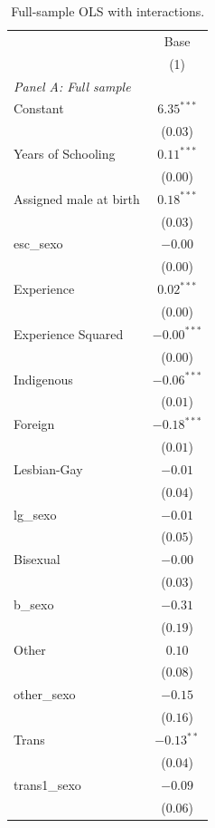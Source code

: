\begin{table}[H]
\begin{center}
\begin{threeparttable}
\captionsetup{margin=0.5cm}
\caption{Full-sample OLS with interactions.}
\label{AT1_full_1col}
\footnotesize
\centering
\begin{tabular}{lc}
\toprule
 & \multicolumn{1}{c}{Base} \\ 
 & (1) \\ \midrule
\textit{Panel A: Full sample} &  \\ 
Constant & $6.35^{***}$ \\ 
 & ($0.03$) \\ 
Years of Schooling & $0.11^{***}$ \\ 
 & ($0.00$) \\ 
Assigned male at birth & $0.18^{***}$ \\ 
 & ($0.03$) \\ 
esc_sexo & $-0.00$ \\ 
 & ($0.00$) \\ 
Experience & $0.02^{***}$ \\ 
 & ($0.00$) \\ 
Experience Squared & $-0.00^{***}$ \\ 
 & ($0.00$) \\ 
Indigenous & $-0.06^{***}$ \\ 
 & ($0.01$) \\ 
Foreign & $-0.18^{***}$ \\ 
 & ($0.01$) \\ 
Lesbian-Gay & $-0.01$ \\ 
 & ($0.04$) \\ 
lg_sexo & $-0.01$ \\ 
 & ($0.05$) \\ 
Bisexual & $-0.00$ \\ 
 & ($0.03$) \\ 
b_sexo & $-0.31$ \\ 
 & ($0.19$) \\ 
Other & $0.10$ \\ 
 & ($0.08$) \\ 
other_sexo & $-0.15$ \\ 
 & ($0.16$) \\ 
Trans & $-0.13^{**}$ \\ 
 & ($0.04$) \\ 
trans1_sexo & $-0.09$ \\ 
 & ($0.06$) \\ 

\end{tabular}
\end{threeparttable}
\end{center}
\end{table}
